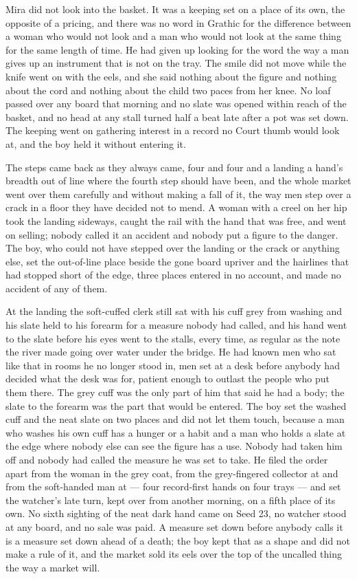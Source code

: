 Mira did not look into the basket. It was a keeping set on a place of its own, the opposite of a pricing, and there was no word in Grathic for the difference between a woman who would not look and a man who would not look at the same thing for the same length of time. He had given up looking for the word the way a man gives up an instrument that is not on the tray. The smile did not move while the knife went on with the eels, and she said nothing about the figure and nothing about the cord and nothing about the child two paces from her knee. No loaf passed over any board that morning and no slate was opened within reach of the basket, and no head at any stall turned half a beat late after a pot was set down. The keeping went on gathering interest in a record no Court thumb would look at, and the boy held it without entering it.

\scenebreak

The steps came back as they always came, four and four and a landing a hand's breadth out of line where the fourth step should have been, and the whole market went over them carefully and without making a fall of it, the way men step over a crack in a floor they have decided not to mend. A woman with a creel on her hip took the landing sideways, caught the rail with the hand that was free, and went on selling; nobody called it an accident and nobody put a figure to the danger. The boy, who could not have stepped over the landing or the crack or anything else, set the out-of-line place beside the gone board upriver and the hairlines that had stopped short of the edge, three places entered in no account, and made no accident of any of them.

At the landing the soft-cuffed clerk still sat with his cuff grey from washing and his slate held to his forearm for a measure nobody had called, and his hand went to the slate before his eyes went to the stalls, every time, as regular as the note the river made going over water under the bridge. He had known men who sat like that in rooms he no longer stood in, men set at a desk before anybody had decided what the desk was for, patient enough to outlast the people who put them there. The grey cuff was the only part of him that said he had a body; the slate to the forearm was the part that would be entered. The boy set the washed cuff and the neat slate on two places and did not let them touch, because a man who washes his own cuff has a hunger or a habit and a man who holds a slate at the edge where nobody else can see the figure has a use. Nobody had taken him off and nobody had called the measure he was set to take. He filed the order apart from the woman in the grey coat, from the grey-fingered collector at  and from the soft-handed man at  --- four record-first hands on four trays --- and set the watcher's late turn, kept over from another morning, on a fifth place of its own. No sixth sighting of the neat dark hand came on Seed 23, no watcher stood at any board, and no sale was paid. A measure set down before anybody calls it is a measure set down ahead of a death; the boy kept that as a shape and did not make a rule of it, and the market sold its eels over the top of the uncalled thing the way a market will.

